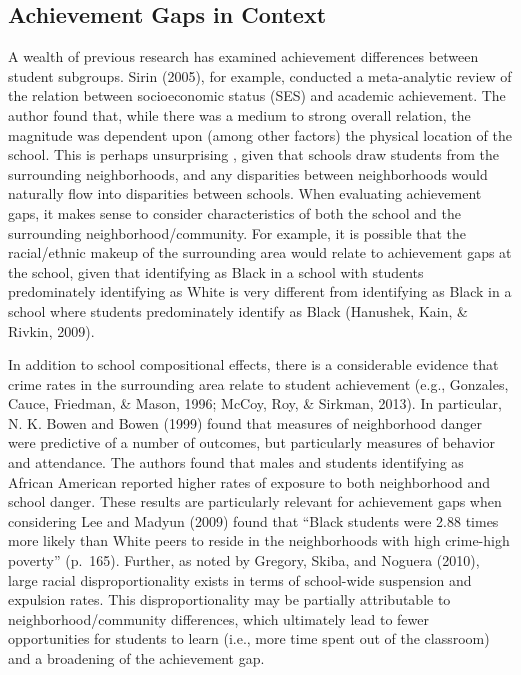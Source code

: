 \documentclass[man, fleqn, noextraspace]{apa6}
\theoremstyle{definition}
\theoremstyle{definition}
\theoremstyle{definition}
\theoremstyle{remark}
\begin{document}
\hypertarget{achievement-gaps-in-context}{%
\subsection{Achievement Gaps in
Context}\label{achievement-gaps-in-context}}

A wealth of previous research has examined achievement differences
between student subgroups. Sirin (2005), for example, conducted a
meta-analytic review of the relation between socioeconomic status (SES)
and academic achievement. The author found that, while there was a
medium to strong overall relation, the magnitude was dependent upon
(among other factors) the physical location of the school. This is
perhaps unsurprising , given that schools draw students from the
surrounding neighborhoods, and any disparities between neighborhoods
would naturally flow into disparities between schools. When evaluating
achievement gaps, it makes sense to consider characteristics of both the
school and the surrounding neighborhood/community. For example, it is
possible that the racial/ethnic makeup of the surrounding area would
relate to achievement gaps at the school, given that identifying as
Black in a school with students predominately identifying as White is
very different from identifying as Black in a school where students
predominately identify as Black (Hanushek, Kain, \& Rivkin, 2009).

In addition to school compositional effects, there is a considerable
evidence that crime rates in the surrounding area relate to student
achievement (e.g., Gonzales, Cauce, Friedman, \& Mason, 1996; McCoy,
Roy, \& Sirkman, 2013). In particular, N. K. Bowen and Bowen (1999)
found that measures of neighborhood danger were predictive of a number
of outcomes, but particularly measures of behavior and attendance. The
authors found that males and students identifying as African American
reported higher rates of exposure to both neighborhood and school
danger. These results are particularly relevant for achievement gaps
when considering Lee and Madyun (2009) found that \enquote{Black
students were 2.88 times more likely than White peers to reside in the
neighborhoods with high crime-high poverty} (p.~165). Further, as noted
by Gregory, Skiba, and Noguera (2010), large racial disproportionality
exists in terms of school-wide suspension and expulsion rates. This
disproportionality may be partially attributable to
neighborhood/community differences, which ultimately lead to fewer
opportunities for students to learn (i.e., more time spent out of the
classroom) and a broadening of the achievement gap.
\end{document}
